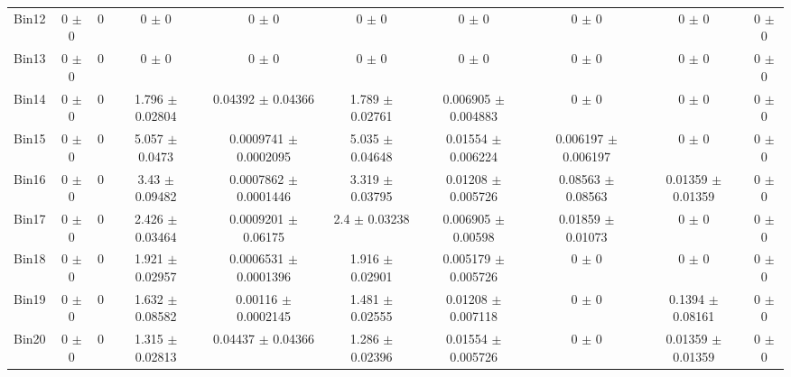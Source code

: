 \begin{tabular}{@{\extracolsep{4pt}}lccccccccc@{}}
     Bin12 & 0 $\pm$ 0 & 0 & 0 $\pm$ 0 & 0 $\pm$ 0 & 0 $\pm$ 0 & 0 $\pm$ 0 & 0 $\pm$ 0 & 0 $\pm$ 0 & 0 $\pm$ 0 \\ 
     Bin13 & 0 $\pm$ 0 & 0 & 0 $\pm$ 0 & 0 $\pm$ 0 & 0 $\pm$ 0 & 0 $\pm$ 0 & 0 $\pm$ 0 & 0 $\pm$ 0 & 0 $\pm$ 0 \\ 
     Bin14 & 0 $\pm$ 0 & 0 & 1.796 $\pm$ 0.02804 & 0.04392 $\pm$ 0.04366 & 1.789 $\pm$ 0.02761 & 0.006905 $\pm$ 0.004883 & 0 $\pm$ 0 & 0 $\pm$ 0 & 0 $\pm$ 0 \\ 
     Bin15 & 0 $\pm$ 0 & 0 & 5.057 $\pm$ 0.0473 & 0.0009741 $\pm$ 0.0002095 & 5.035 $\pm$ 0.04648 & 0.01554 $\pm$ 0.006224 & 0.006197 $\pm$ 0.006197 & 0 $\pm$ 0 & 0 $\pm$ 0 \\ 
     Bin16 & 0 $\pm$ 0 & 0 & 3.43 $\pm$ 0.09482 & 0.0007862 $\pm$ 0.0001446 & 3.319 $\pm$ 0.03795 & 0.01208 $\pm$ 0.005726 & 0.08563 $\pm$ 0.08563 & 0.01359 $\pm$ 0.01359 & 0 $\pm$ 0 \\ 
     Bin17 & 0 $\pm$ 0 & 0 & 2.426 $\pm$ 0.03464 & 0.0009201 $\pm$ 0.06175 & 2.4 $\pm$ 0.03238 & 0.006905 $\pm$ 0.00598 & 0.01859 $\pm$ 0.01073 & 0 $\pm$ 0 & 0 $\pm$ 0 \\ 
     Bin18 & 0 $\pm$ 0 & 0 & 1.921 $\pm$ 0.02957 & 0.0006531 $\pm$ 0.0001396 & 1.916 $\pm$ 0.02901 & 0.005179 $\pm$ 0.005726 & 0 $\pm$ 0 & 0 $\pm$ 0 & 0 $\pm$ 0 \\ 
     Bin19 & 0 $\pm$ 0 & 0 & 1.632 $\pm$ 0.08582 & 0.00116 $\pm$ 0.0002145 & 1.481 $\pm$ 0.02555 & 0.01208 $\pm$ 0.007118 & 0 $\pm$ 0 & 0.1394 $\pm$ 0.08161 & 0 $\pm$ 0 \\ 
     Bin20 & 0 $\pm$ 0 & 0 & 1.315 $\pm$ 0.02813 & 0.04437 $\pm$ 0.04366 & 1.286 $\pm$ 0.02396 & 0.01554 $\pm$ 0.005726 & 0 $\pm$ 0 & 0.01359 $\pm$ 0.01359 & 0 $\pm$ 0 \\ 
\hline\hline
  \end{tabular}

